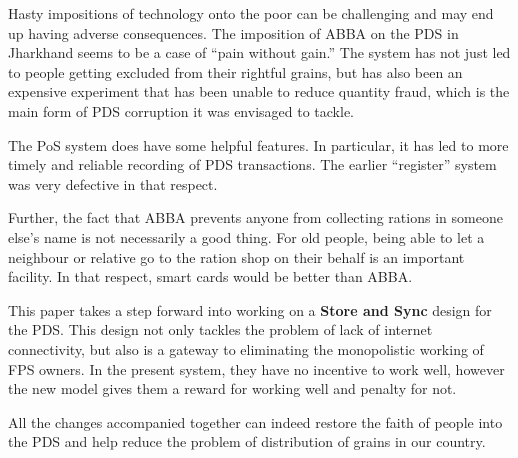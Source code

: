 \documentclass[a4paper,12pt]{extarticle}
\begin{document}
Hasty impositions of technology onto the poor can be challenging and may end up having adverse consequences. The imposition of ABBA on the PDS in Jharkhand seems to be a case of “pain without gain.” 
The system has not just led to people getting excluded from their rightful grains, but has also been an expensive experiment that has been unable to reduce quantity fraud, which is the main form of PDS corruption it was envisaged to tackle. 

The PoS system does have some helpful features. In particular, it has led to more timely and reliable recording of PDS transactions. The earlier “register” system was very defective in that respect. 

Further, the fact that ABBA prevents anyone from collecting
rations in someone else’s name is not necessarily a good
thing. For old people, being able to let a neighbour or relative
go to the ration shop on their behalf is an important facility.
In that respect, smart cards would be better than ABBA.

This paper takes a step forward into working on a \textbf{Store and Sync} design for the PDS. This design not only tackles the problem of lack of internet connectivity, but also is a gateway to eliminating the monopolistic working of FPS owners. In the present system, they have no incentive to work well, however the new model gives them a reward for working well and penalty for not.

All the changes accompanied together can indeed restore the faith of people into the PDS and help reduce the problem of distribution of grains in our country.
\end{document}
